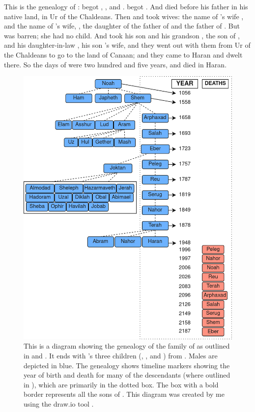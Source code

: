 
\bverse This is the genealogy of :  begot , , and .  begot .
\bverse And  died before his father  in his native land, in Ur of the Chaldeans.
\bverse Then  and  took wives: the name of 's wife \was {}, and the name of 's wife, , the daughter of  the father of  and the father of .
\bverse But  was barren; she had no child.
\bverse And  took his son  and his grandson , the son of , and his daughter-in-law , his son 's wife, and they went out with them from Ur of the Chaldeans to go to the land of Canaan; and they came to Haran and dwelt there.
\bverse So the days of  were two hundred and five years, and  died in Haran.



\begin{figure}[htbp] %
	\centering
	\includegraphics[width=0.9\linewidth]{images/genealogies/shems_genealogy.png}
	\caption{This is a diagram showing the genealogy of the family of  as outlined in  and . It ends with 's three children (, , and ) from . Males are depicted in blue. The genealogy shows timeline markers showing the year of birth and death for many of the descendants (where outlined in ), which are primarily in the dotted box. The box with a bold border represents all the sons of . This diagram was created by me using the draw.io tool \cite{draw.io}.}
	\label{fig:shems_genealogy}
\end{figure}
